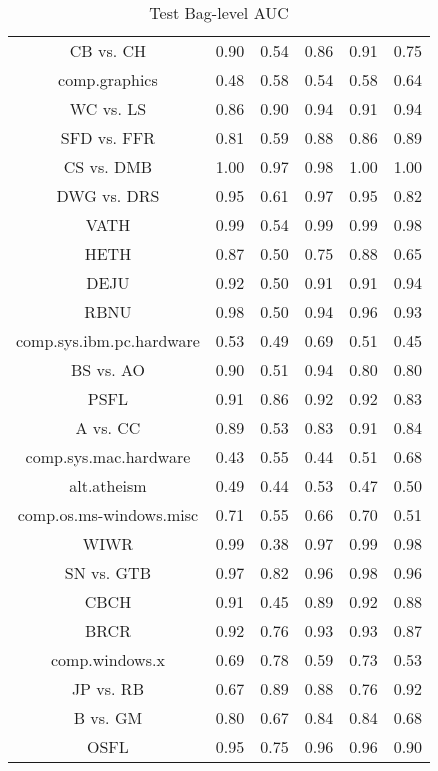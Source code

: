 \begin{table}[ht]\footnotesize
\centering
\caption{Test Bag-level AUC}
\label{Table:mil_test_bag_AUC}
\begin{tabular}{|c|c|c|c|c|c|}
  \hline
          &\MIB{}  &  \rB{}  &  \MB{}  &  \AB{}  &  \AuerB{}\\ 
  \hline
CB vs. CH  &  0.90   &  0.54   &  0.86   &  0.91   &  0.75 \\ 
comp.graphics  &  0.48   &  0.58   &  0.54   &  0.58   &  0.64 \\ 
WC vs. LS  &  0.86   &  0.90   &  0.94   &  0.91   &  0.94 \\ 
SFD vs. FFR  &  0.81   &  0.59   &  0.88   &  0.86   &  0.89 \\ 
CS vs. DMB  &  1.00   &  0.97   &  0.98   &  1.00   &  1.00 \\ 
DWG vs. DRS  &  0.95   &  0.61   &  0.97   &  0.95   &  0.82 \\ 
VATH  &  0.99   &  0.54   &  0.99   &  0.99   &  0.98 \\ 
HETH  &  0.87   &  0.50   &  0.75   &  0.88   &  0.65 \\ 
DEJU  &  0.92   &  0.50   &  0.91   &  0.91   &  0.94 \\ 
RBNU  &  0.98   &  0.50   &  0.94   &  0.96   &  0.93 \\ 
comp.sys.ibm.pc.hardware  &  0.53   &  0.49   &  0.69   &  0.51   &  0.45 \\ 
BS vs. AO  &  0.90   &  0.51   &  0.94   &  0.80   &  0.80 \\ 
PSFL  &  0.91   &  0.86   &  0.92   &  0.92   &  0.83 \\ 
A vs. CC  &  0.89   &  0.53   &  0.83   &  0.91   &  0.84 \\ 
comp.sys.mac.hardware  &  0.43   &  0.55   &  0.44   &  0.51   &  0.68 \\ 
alt.atheism  &  0.49   &  0.44   &  0.53   &  0.47   &  0.50 \\ 
comp.os.ms-windows.misc  &  0.71   &  0.55   &  0.66   &  0.70   &  0.51 \\ 
WIWR  &  0.99   &  0.38   &  0.97   &  0.99   &  0.98 \\ 
SN vs. GTB  &  0.97   &  0.82   &  0.96   &  0.98   &  0.96 \\ 
CBCH  &  0.91   &  0.45   &  0.89   &  0.92   &  0.88 \\ 
BRCR  &  0.92   &  0.76   &  0.93   &  0.93   &  0.87 \\ 
comp.windows.x  &  0.69   &  0.78   &  0.59   &  0.73   &  0.53 \\ 
JP vs. RB  &  0.67   &  0.89   &  0.88   &  0.76   &  0.92 \\ 
B vs. GM  &  0.80   &  0.67   &  0.84   &  0.84   &  0.68 \\ 
OSFL  &  0.95   &  0.75   &  0.96   &  0.96   &  0.90 \\ 
\hline
 \end{tabular}
  \end{table}


